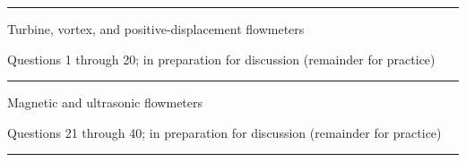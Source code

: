 \vskip 5pt

\filbreak
\hrule \vskip 5pt
\noindent {} 

\vskip 5pt


\vskip 2pt  Turbine, vortex, and positive-displacement flowmeters

\vskip 2pt \noindent Questions 1 through 20;  in preparation for discussion (remainder for practice)

\vskip 10pt



\filbreak
\hrule \vskip 5pt
\noindent {}

\vskip 5pt



\vskip 2pt  Magnetic and ultrasonic flowmeters

\vskip 2pt \noindent Questions 21 through 40;  in preparation for discussion (remainder for practice)

\vskip 10pt



\filbreak
\hrule \vskip 5pt
\noindent {}

